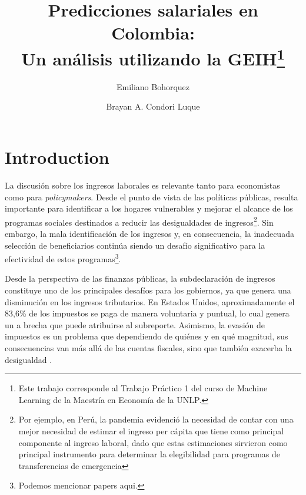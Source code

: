 \documentclass[11pt,oneside]{article}
\begin{document}
	
	
	\title{Predicciones salariales en Colombia: \\
		Un análisis utilizando la GEIH\thanks{Este trabajo corresponde al Trabajo Práctico 1 del curso de Machine Learning de la Maestría en Economía de la UNLP.}}
	
	\author{
		Emiliano Bohorquez \and 
		Brayan A. Condori Luque}
	
	\maketitle
	
	\newpage
	
	\section{Introduction}

	La discusión sobre los ingresos laborales es relevante tanto para economistas como para \textit{policymakers}. Desde el punto de vista de las políticas públicas, resulta importante para identificar a los hogares vulnerables y mejorar el alcance de los programas sociales destinados a reducir las desigualdades de ingresos\footnote{Por ejemplo, en Perú, la pandemia evidenció la necesidad de contar con una mejor necesidad de estimar el ingreso per cápita que tiene como principal componente al ingreso laboral, dado que estas estimaciones sirvieron como principal instrumento para determinar la elegibilidad para programas de transferencias de emergencia}. Sin embargo, la mala identificación de los ingresos y, en consecuencia, la inadecuada selección de beneficiarios continúa siendo un desafío significativo para la efectividad de estos programas\footnote{Podemos mencionar papers aqui. }.

	Desde la perspectiva de las finanzas públicas, la subdeclaración de ingresos constituye uno de los principales desafíos para los gobiernos, ya que genera una disminución en los ingresos tributarios. En Estados Unidos, aproximadamente el 83,6\% de los impuestos se paga de manera voluntaria y puntual, lo cual genera un a brecha que puede atribuirse al subreporte. Asimismo, la evasión de impuestos es un problema que dependiendo de quiénes y en qué magnitud, sus consecuencias van más allá de las cuentas fiscales, sino que también exacerba la desigualdad \citep{alstadsaeter2019tax}.
	
\end{document}
